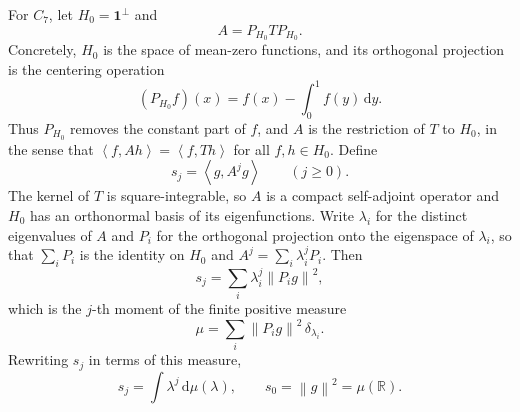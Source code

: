 ﻿\documentclass[11pt]{article}
\numberwithin{equation}{section}
\newcommand{\one}{\mathbf 1}
\newcommand{\R}{\mathbb R}
\newcommand{\ip}[2]{\left\langle #1,#2\right\rangle}
\newcommand{\norm}[1]{\left\lVert #1\right\rVert}
\newcommand{\dd}{\,\mathrm d}
\begin{document}
For $C_7$, let $H_0=\one^\perp$ and
\[
  A=P_{H_0}TP_{H_0}.
\]
Concretely, $H_0$ is the space of mean-zero functions, and its orthogonal projection is the centering operation
\[
  (P_{H_0}f)(x)=f(x)-\int_0^1f(y)\dd y.
\]
Thus $P_{H_0}$ removes the constant part of $f$, and $A$ is the restriction of $T$ to $H_0$, in the sense that $\ip f{Ah}=\ip f{Th}$ for all $f,h\in H_0$.
Define
\begin{equation}\label{eq:sj-def}
  s_j=\ip g{A^jg}\qquad(j\ge0).
\end{equation}
The kernel of $T$ is square-integrable, so $A$ is a compact self-adjoint operator and $H_0$ has an orthonormal basis of its eigenfunctions.
Write $\lambda_i$ for the distinct eigenvalues of $A$ and $P_i$ for the orthogonal projection onto the eigenspace of $\lambda_i$, so that $\sum_iP_i$ is the identity on $H_0$ and $A^j=\sum_i\lambda_i^jP_i$.
Then
\[
  s_j=\sum_i\lambda_i^j\norm{P_ig}^2,
\]
which is the $j$-th moment of the finite positive measure
\begin{equation}\label{eq:mu-short}
  \mu=\sum_i\norm{P_ig}^2\,\delta_{\lambda_i}.
\end{equation}
Rewriting $s_j$ in terms of this measure,
\begin{equation}\label{eq:sj-moment}
  s_j=\int\lambda^j\dd\mu(\lambda),
  \qquad s_0=\norm g^2=\mu(\R).
\end{equation}
\end{document}
